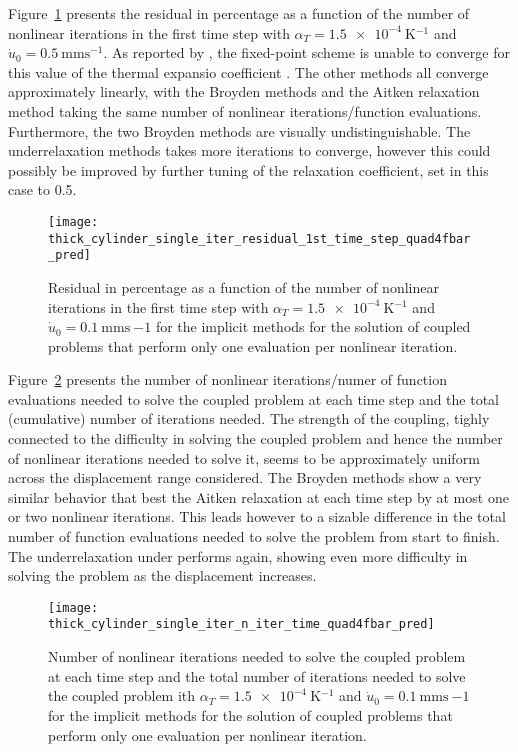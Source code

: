 Figure~\ref{fig:thick_cylinder_single_iter_residual_1st_time_step_quad4fbar_pred} presents the residual in percentage as a function of the number of nonlinear iterations in the first time step with \(\alpha_T=\SI{1.5e-4}{\kelvin^{-1}}\) and \(\dot u_0 =\SI{0.5}{\milli\meter\second^{-1}}\).
As reported by \cite{erbts_accelerated_2012}, the fixed-point scheme is unable to converge for this value of the thermal expansio coefficient .
The other methods all converge approximately linearly, with the Broyden methods and the Aitken relaxation method taking the same number of nonlinear iterations/function evaluations.
Furthermore, the two Broyden methods are visually undistinguishable.
The underrelaxation methods takes more iterations to converge, however this could possibly be improved by further tuning of the relaxation coefficient, set in this case to 0.5.

\begin{figure}
  \texttt{[image: thick\_cylinder\_single\_iter\_residual\_1st\_time\_step\_quad4fbar\_pred]}
  \caption{Residual in percentage as a function of the number of nonlinear iterations in the first time step with \(\alpha_T=\SI{1.5e-4}{\kelvin^{-1}}\) and \(\dot u_0 =\SI{0.1}{\milli\meter\second~{-1}}\) for the implicit methods for the solution of coupled problems that perform only one evaluation per nonlinear iteration.}
\label{fig:thick_cylinder_single_iter_residual_1st_time_step_quad4fbar_pred}
\end{figure}

Figure~\ref{fig:thick_cylinder_single_iter_n_iter_time_quad4fbar_pred} presents the number of nonlinear iterations/numer of function evaluations needed to solve the coupled problem at each time step and the total (cumulative) number of iterations needed.
The strength of the coupling, tighly connected to the difficulty in solving the coupled problem and hence the number of nonlinear iterations needed to solve it, seems to be approximately uniform across the displacement range considered.
The Broyden methods show a very similar behavior that best the Aitken relaxation at each time step by at most one or two nonlinear iterations.
This leads however to a sizable difference in the total number of function evaluations needed to solve the problem from start to finish.
The underrelaxation under performs again, showing even more difficulty in solving the problem as the displacement increases.

\begin{figure}
  \texttt{[image: thick\_cylinder\_single\_iter\_n\_iter\_time\_quad4fbar\_pred]}
  \caption{Number of nonlinear iterations needed to solve the coupled problem at each time step and the total number of iterations needed to solve the coupled problem ith \(\alpha_T=\SI{1.5e-4}{\kelvin^{-1}}\) and \(\dot u_0 =\SI{0.1}{\milli\meter\second~{-1}}\) for the implicit methods for the solution of coupled problems that perform only one evaluation per nonlinear iteration.}
\label{fig:thick_cylinder_single_iter_n_iter_time_quad4fbar_pred}
\end{figure}

